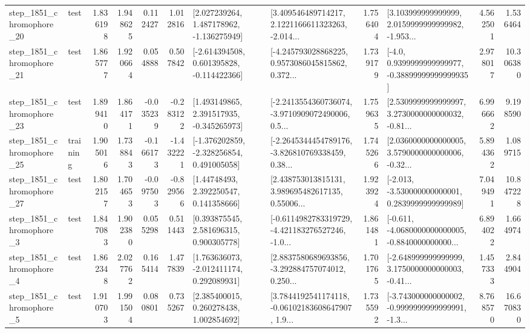 \begin{tabular}{llrrrrllrlrr}
 step\_1851\_chromophore\_20 &      test &      1.836198 &    1.948625 &      0.112427 &  1.012816 &    [2.027239264, 1.487178962, -1.136275949] &  [3.409546489714217, 2.1221166611323263, -2.014... &       1.756404 &  [3.103999999999999, 2.0159999999999982, -1.953... &            4.562501 &          1.536464 \\
 step\_1851\_chromophore\_21 &      test &      1.865777 &    1.920664 &      0.054888 &  0.507842 &   [-2.614394508, 0.601395828, -0.114422366] &  [-4.245793028868225, 0.9573086045815862, 0.372... &       1.739179 &   [-4.0, 0.9399999999999977, -0.38899999999999935] &            2.978017 &         10.306380 \\
 step\_1851\_chromophore\_23 &      test &      1.899410 &    1.864171 &     -0.035239 & -0.283122 &    [1.493149865, 2.391517935, -0.345265973] &  [-2.2413554360736074, -3.9710909072490006, 0.5... &       1.759635 &  [2.5309999999999997, 3.2730000000000032, -0.81... &            6.996662 &          9.198590 \\
 step\_1851\_chromophore\_25 &  training &      1.905016 &    1.738843 &     -0.166173 & -1.432221 &   [-1.376202859, -2.328256854, 0.491005058] &  [-2.2645344454789176, -3.826810769338459, 0.38... &       1.745266 &  [2.0360000000000005, 3.5790000000000006, -0.32... &            5.894362 &          1.089715 \\
 step\_1851\_chromophore\_27 &      test &      1.802157 &    1.704653 &     -0.097503 & -0.829566 &      [1.44748493, 2.392250547, 0.141358666] &  [2.438753013815131, 3.989695482617135, 0.55006... &       1.923924 &   [-2.013, -3.530000000000001, 0.2839999999999989] &            7.049491 &         10.847228 \\
  step\_1851\_chromophore\_3 &      test &      1.847083 &    1.902380 &      0.055298 &  0.511443 &     [0.393875545, 2.581696315, 0.900305778] &  [-0.6114982783319729, -4.421183276527246, -1.0... &       1.861481 &  [-0.611, -4.0680000000000005, -0.8840000000000... &            6.894022 &          1.664974 \\
  step\_1851\_chromophore\_4 &      test &      1.862348 &    2.027762 &      0.165414 &  1.477839 &    [1.763636073, -2.012411174, 0.292089931] &  [2.8837580689693856, -3.292884757074012, 0.250... &       1.701765 &  [-2.648999999999999, 3.1750000000000003, -0.41... &            1.457333 &          2.844904 \\
  step\_1851\_chromophore\_5 &      test &      1.910703 &    1.991504 &      0.080801 &  0.735267 &     [2.385400015, 0.260278438, 1.002854692] &  [3.7844192541174118, -0.06102183608647907, 1.9... &       1.735592 &  [-3.743000000000002, -0.9999999999999991, -1.3... &            8.768570 &         16.670830 \\

\end{tabular}
